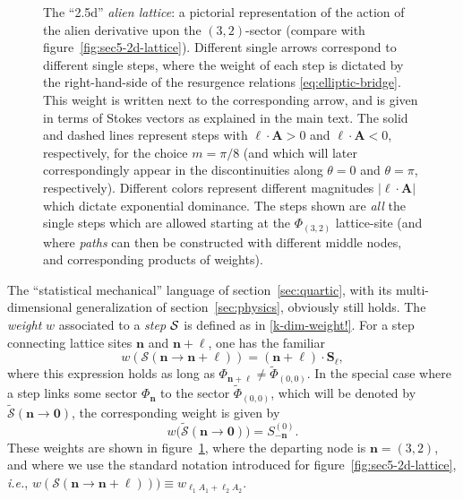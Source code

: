 \documentclass[11pt,a4paper]{article}
\newcommand{\CS}{{\cal S}}
\newcommand{\be}{\begin{equation}}
\newcommand{\ee}{\end{equation}}
\begin{document}
\begin{figure}[t!]
\caption{The ``2.5d'' \textit{alien lattice}: a pictorial representation of the action of the alien derivative upon the $(3,2)$-sector (compare with figure~\ref{fig:sec5-2d-lattice}). Different single arrows correspond to different single steps, where the weight of each step is dictated by the right-hand-side of the resurgence relations \eqref{eq:elliptic-bridge}. This weight is written next to the corresponding arrow, and is given in terms of Stokes vectors as explained in the main text. The solid and dashed lines represent steps with $\boldsymbol{\ell} \cdot \boldsymbol{A} > 0$ and $\boldsymbol{\ell} \cdot \boldsymbol{A} < 0$, respectively, for the choice $m=\pi/8$ (and which will later correspondingly appear in the discontinuities along $\theta=0$ and $\theta=\pi$, respectively). Different colors represent different magnitudes $\left| \boldsymbol{\ell} \cdot \boldsymbol{A} \right|$ which dictate exponential dominance. The steps shown are \textit{all} the single steps which are allowed starting at the $\Phi_{(3,2)}$ lattice-site (and where \textit{paths} can then be constructed with different middle nodes, and corresponding products of weights).
}
\label{fig:chain-nonres}
\end{figure}

The ``statistical mechanical'' language of section~\ref{sec:quartic}, with its multi-dimensional generalization of section~\ref{sec:physics}, obviously still holds. The \textit{weight} $w$ associated to a \textit{step} $\CS$ is defined as in \eqref{k-dim-weight!}. For a step connecting lattice sites $\boldsymbol{n}$ and $\boldsymbol{n} + \boldsymbol{\ell}$, one has the familiar
%
\be
\label{eq:elliptic-weight-step}
w \left( \mathcal{S} \left( \boldsymbol{n} \rightarrow \boldsymbol{n} + \boldsymbol{\ell} \right) \right) = \left( \boldsymbol{n} + \boldsymbol{\ell} \right) \cdot \boldsymbol{S}_{\boldsymbol{\ell}},
\ee
%
\noindent
where this expression holds as long as $\Phi_{\boldsymbol{n} + \boldsymbol{\ell}} \ne \widetilde{\Phi}_{(0,0)}$. In the special case where a step links some sector $\Phi_{\boldsymbol{n}}$ to the sector $\widetilde{\Phi}_{(0,0)}$, which will be denoted by $\widetilde{\mathcal{S}} \left( \boldsymbol{n} \rightarrow \boldsymbol{0} \right)$, the corresponding weight is given by
%
\be
\label{eq:elliptic-weight-tilde}
w \big( \widetilde{\mathcal{S}} \left( \boldsymbol{n} \rightarrow \boldsymbol{0} \right) \big) = S^{(0)}_{-\boldsymbol{n}}.
\ee
%
\noindent
These weights are shown in figure~\ref{fig:chain-nonres}, where the departing node is  $\boldsymbol{n} = (3,2)$, and where we use the standard notation introduced for figure~\ref{fig:sec5-2d-lattice}, \textit{i.e.}, $w \left( \mathcal{S} \left( \boldsymbol{n} \rightarrow \boldsymbol{n} + \boldsymbol{\ell} \right) \right)) \equiv w_{\ell_1 A_1+\ell_2 A_2}$.
\end{document}
